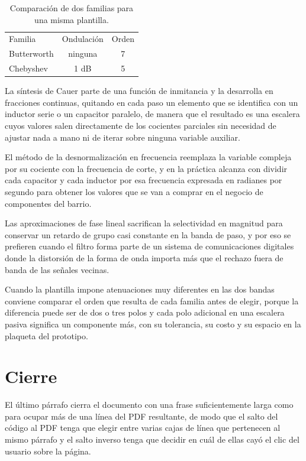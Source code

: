 \documentclass[11pt]{article}
\begin{document}
\begin{table}[h]
  \centering
  \begin{tabular}{lcc}
    Familia & Ondulación & Orden \\
    Butterworth & ninguna & 7 \\
    Chebyshev & 1 dB & 5 \\
  \end{tabular}
  \caption{Comparación de dos familias para una misma plantilla.}
\end{table}

La síntesis de Cauer parte de una función de inmitancia y la desarrolla en fracciones continuas, quitando en cada paso un elemento que se identifica con un inductor serie o un capacitor paralelo, de manera que el resultado es una escalera cuyos valores salen directamente de los cocientes parciales sin necesidad de ajustar nada a mano ni de iterar sobre ninguna variable auxiliar.

El método de la desnormalización en frecuencia reemplaza la variable compleja por su cociente con la frecuencia de corte, y en la práctica alcanza con dividir cada capacitor y cada inductor por esa frecuencia expresada en radianes por segundo para obtener los valores que se van a comprar en el negocio de componentes del barrio.

Las aproximaciones de fase lineal sacrifican la selectividad en magnitud para conservar un retardo de grupo casi constante en la banda de paso, y por eso se prefieren cuando el filtro forma parte de un sistema de comunicaciones digitales donde la distorsión de la forma de onda importa más que el rechazo fuera de banda de las señales vecinas.

Cuando la plantilla impone atenuaciones muy diferentes en las dos bandas conviene comparar el orden que resulta de cada familia antes de elegir, porque la diferencia puede ser de dos o tres polos y cada polo adicional en una escalera pasiva significa un componente más, con su tolerancia, su costo y su espacio en la plaqueta del prototipo.

\section{Cierre}

El último párrafo cierra el documento con una frase suficientemente larga como para ocupar más de una línea del PDF resultante, de modo que el salto del código al PDF tenga que elegir entre varias cajas de línea que pertenecen al mismo párrafo y el salto inverso tenga que decidir en cuál de ellas cayó el clic del usuario sobre la página.
\end{document}
